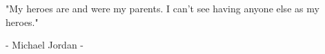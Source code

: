 \text{ }
\vspace{5cm}

\begin{center}\bfseries




"My heroes are and were my parents. I can't see having anyone else as my heroes."

\mdseries

- Michael Jordan -

\end{center}
